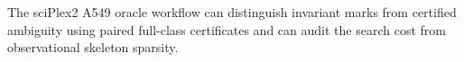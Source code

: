 The sciPlex2 A549 oracle workflow can distinguish invariant marks from certified ambiguity using paired full-class certificates and can audit the search cost from observational skeleton sparsity.